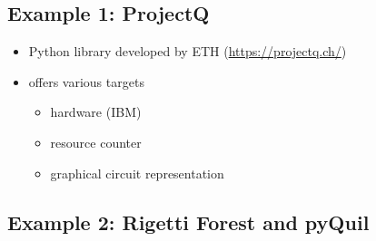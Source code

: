 \documentclass{beamer}
\begin{document}
\subsection{Example 1: ProjectQ}

\begin{frame}{\insertsection}{\insertsubsection}
	\begin{itemize}
        \item Python library developed by ETH (\url{https://projectq.ch/})
        \item offers various targets
        \begin{itemize}
            \item hardware (IBM)
            \item resource counter
            \item graphical circuit representation
        \end{itemize}
    \end{itemize}
\end{frame}

\begin{frame}{\insertsection}{\insertsubsection}
	
\end{frame}

\begin{frame}{\insertsection}{\insertsubsection}
	
\end{frame}

\begin{frame}{\insertsection}{\insertsubsection}
	
\end{frame}


\subsection{Example 2: Rigetti Forest and pyQuil}

\begin{frame}{\insertsection}{\insertsubsection}
	
\end{frame}
\end{document}

